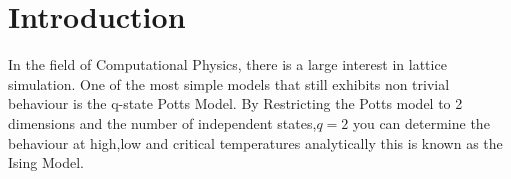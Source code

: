 \chapter{Introduction}
In the field of Computational Physics, there is a large interest in lattice simulation.
One of the most simple models that still exhibits non trivial behaviour is the q-state Potts Model.
By Restricting the Potts model to 2 dimensions and the number of independent states,$q = 2$ you can determine the behaviour at high,low and critical temperatures analytically \cite{Montroll1963}this is known as the Ising Model.
